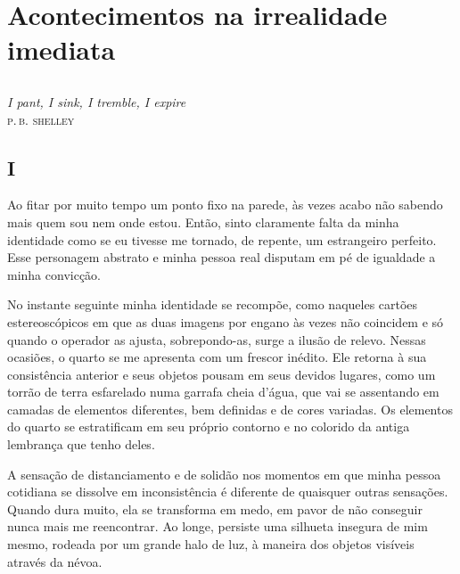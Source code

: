 \part{Acontecimentos na irrealidade imediata}

\chapter*{}
\thispagestyle{empty}

\vfill
\begin{flushright}
\textit{I pant, I sink, I tremble, I expire}\\
{\centering\textsc{p.\,b. shelley}}
\end{flushright}

\chapter*{\centering\Large{I}}

Ao fitar por muito tempo um ponto fixo na parede, às vezes acabo não sabendo mais quem sou nem onde estou. Então, sinto claramente falta da minha identidade como se eu tivesse me tornado, de repente, um estrangeiro perfeito. Esse personagem abstrato e minha pessoa real disputam em pé de igualdade a minha convicção.

No instante seguinte minha identidade se recompõe, como naqueles cartões estereoscópicos em que as duas imagens por engano às vezes não coincidem e só quando o operador as ajusta, sobrepondo-as, surge a ilusão de relevo. Nessas ocasiões, o quarto se me apresenta com um frescor inédito. Ele retorna à sua consistência anterior e seus objetos pousam em seus devidos lugares, como um torrão de terra esfarelado numa garrafa cheia d’água, que vai se assentando em camadas de elementos diferentes, bem definidas e de cores variadas. Os elementos do quarto se estratificam em seu próprio contorno e no colorido da antiga lembrança que tenho deles.

A sensação de distanciamento e de solidão nos momentos em que minha pessoa cotidiana se dissolve em inconsistência é diferente de quaisquer outras sensações. Quando dura muito, ela se transforma em medo, em pavor de não conseguir nunca mais me reencontrar. Ao longe, persiste uma silhueta insegura de mim mesmo, rodeada por um grande halo de luz, à maneira dos objetos visíveis através da névoa.


